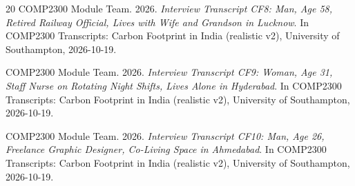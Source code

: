 \documentclass[12pt, a4paper]{article}
\begin{document}
\begin{thebibliography}{20}
COMP2300 Module Team. 2026. \textit{Interview Transcript CF8: Man, Age 58, Retired Railway Official, Lives with Wife and Grandson in Lucknow}. In COMP2300 Transcripts: Carbon Footprint in India (realistic v2), University of Southampton, 2026-10-19.

COMP2300 Module Team. 2026. \textit{Interview Transcript CF9: Woman, Age 31, Staff Nurse on Rotating Night Shifts, Lives Alone in Hyderabad}. In COMP2300 Transcripts: Carbon Footprint in India (realistic v2), University of Southampton, 2026-10-19.

COMP2300 Module Team. 2026. \textit{Interview Transcript CF10: Man, Age 26, Freelance Graphic Designer, Co-Living Space in Ahmedabad}. In COMP2300 Transcripts: Carbon Footprint in India (realistic v2), University of Southampton, 2026-10-19.

\end{thebibliography}
\end{document}
